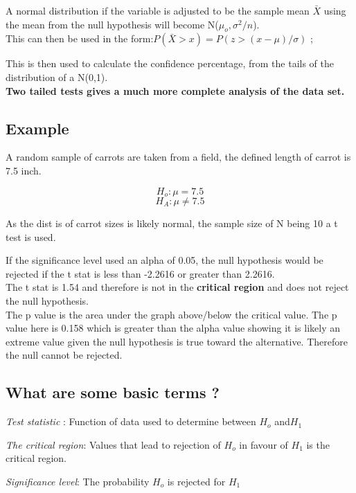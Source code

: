 \documentclass[11pt]{scrartcl} %
\begin{document}
A normal distribution if the variable is adjusted to be the sample mean
\(\bar{X}\) using the mean from the null hypothesis will become
N(\(\mu_o,\sigma^2/n\)).\\

This can then be used in the form:\(P(\bar{X} > x) = P(z > (x-\mu) /\sigma)\) ; 

This is then used to calculate the confidence percentage, from the tails of the distribution
of a N(0,1).\\

\textbf{Two tailed tests gives a much more complete analysis of the data
set.}

\subsection{Example}

A random sample of carrots are taken from a field, the defined length of carrot is 7.5 inch.

\[H_o:\mu =7.5\] 
\[H_A:\mu\neq 7.5\]

As the dist is of carrot sizes is likely normal, the sample size of N being 10 a t test is used.

If the significance level used an alpha of 0.05, the null hypothesis would be rejected if the t stat
is less than -2.2616 or greater than 2.2616. \\

The t stat is 1.54 and therefore is not in the \textbf{critical region} and does not reject the null
hypothesis. \\

The p value is the area under the graph above/below the critical value. The p value here is 0.158
which is greater than the alpha value showing it is likely an extreme value given the null hypothesis
is true toward the alternative. Therefore the null cannot be rejected.

\subsection{What are some basic terms
?}

\emph{Test statistic} : Function of data used to determine between
\(H_o\) and\(H_1\)

\emph{The critical region}: Values that lead to rejection of \(H_o\) in
favour of \(H_1\) is the critical region.

\emph{Significance level}: The probability \(H_o\) is rejected for
\(H_1\)
\end{document}
